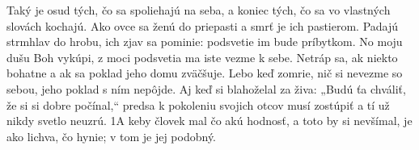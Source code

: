 Taký je osud tých, čo sa spoliehajú na seba,
a koniec tých, čo sa vo vlastných slovách kochajú.
\versseparator
Ako ovce sa ženú do priepasti
a smrť je ich pastierom.
\versseparator
Padajú strmhlav do hrobu,
ich zjav sa pominie:
podsvetie im bude príbytkom.
\versseparator
No moju dušu Boh vykúpi,
z moci podsvetia ma iste vezme k sebe.
\versseparator
Netráp sa, ak niekto bohatne
a ak sa poklad jeho domu zväčšuje.
\versseparator
Lebo keď zomrie, nič si nevezme so sebou,
jeho poklad s ním nepôjde.
\versseparator
Aj keď si blahoželal za živa:
„Budú ťa chváliť, že si si dobre počínal,“
\versseparator
predsa k pokoleniu svojich otcov musí zostúpiť
a tí už nikdy svetlo neuzrú.
\versseparator
1A keby človek mal čo akú hodnosť, a toto by si nevšímal,
je ako lichva, čo hynie;
v tom je jej podobný.